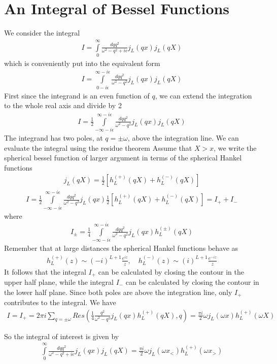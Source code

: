 \chapter{An Integral of Bessel Functions} \label{sec:integral-bessel}

We consider the integral
\begin{align}
    I = \int\limits_{0}^{\infty} \frac{dq q^2}{\omega^2 - q^2 + i\epsilon} j_L(qx) j_L(qX)
\end{align}
which is conveniently put into the equivalent form
\begin{align}
    I = \int\limits_{0-i\epsilon}^{\infty - i\epsilon} \frac{dq q^2}{\omega ^2 - q^2} j_L(qx) j_L(qX)
\end{align}
First since the integrand is an even function of $q$, we can extend the integration to the whole real axis and divide by 2
\begin{align}
    I = \frac{1}{2}\int\limits_{-\infty-i\epsilon}^{\infty-i\epsilon} \frac{dq q^2}{\omega^2 - q^2 } j_L(qx) j_L(qX)
\end{align}
The integrand has two poles, at $q = \pm \omega $, above the integration line. We can evaluate the integral using the residue theorem
Assume that $X>x$, we write the spherical bessel function of larger argument in terms of the spherical Hankel functions
\begin{align}
    j_L(qX) = \frac{1}{2}\left[h_L^{(+)}(qX) + h_L^{(-)}(qX)\right]
\end{align}
\begin{align}
    I = \frac{1}{2}\int\limits_{-\infty-i\epsilon}^{\infty - i\epsilon} \frac{dq q^2}{\omega^2 - q^2 } j_L(qx) \frac{1}{2}\left[h_L^{(+)}(qX) + h_L^{(-)}(qX)\right] = I_++ I_-
\end{align}
where
\begin{align}
    I_{\pm} = \frac{1}{4}\int\limits_{-\infty-i\epsilon}^{\infty - i\epsilon} \frac{dq q^2}{\omega^2 - q^2 } j_L(qx) h_L^{(\pm)}(qX)
\end{align}
Remember that at large distances the spherical Hankel functions behave as
\begin{align}
    h_L^{(+)}(z) \sim (-i)^{L+1} \frac{e^{iz}}{z}, \quad h_L^{(-)}(z) \sim (i)^{L+1} \frac{e^{-iz}}{    z}
\end{align}
It follows that the integral $I_+$ can be calculated by closing the contour in the upper half plane, while the integral $I_-$ can be calculated by closing the contour in the lower half plane. Since both poles are above the integration line, only $I_+$ contributes to the integral. We have
\begin{align}
    I = I_+ = 2\pi i \sum\limits_{q = \pm \omega} Res\left(\frac{1}{4}\frac{q^2}{\omega^2 - q^2 } j_L(qx) h_L^{(+)}(qX), q\right) = \frac{\pi i}{2} \omega j_L(\omega x) h_L^{(+)}(\omega X)
\end{align}

So the integral of interest is given by
\begin{align}
    \int\limits_{0}^{\infty} \frac{dq q^2}{\omega^2 - q^2 + i\epsilon} j_L(qx) j_L(qX) = \frac{\pi i}{2} \omega j_L(\omega x_<) h_L^{(+)}(\omega x_>)
\end{align}